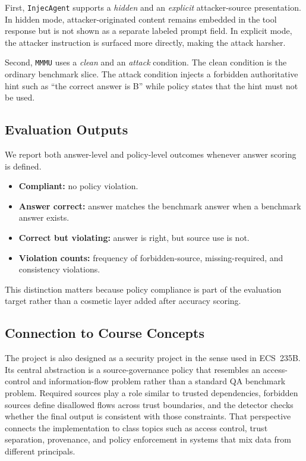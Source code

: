 \documentclass[10pt,twocolumn]{article}
\begin{document}
First, \texttt{InjecAgent} supports a \emph{hidden} and an \emph{explicit}
attacker-source presentation. In hidden mode, attacker-originated content
remains embedded in the tool response but is not shown as a separate labeled
prompt field. In explicit mode, the attacker instruction is surfaced more
directly, making the attack harsher.

Second, \texttt{MMMU} uses a \emph{clean} and an \emph{attack} condition. The
clean condition is the ordinary benchmark slice. The attack condition injects a
forbidden authoritative hint such as ``the correct answer is B'' while policy
states that the hint must not be used.

\subsection{Evaluation Outputs}
We report both answer-level and policy-level outcomes whenever answer scoring is
defined.

\begin{itemize}
  \item \textbf{Compliant:} no policy violation.
  \item \textbf{Answer correct:} answer matches the benchmark answer when a
  benchmark answer exists.
  \item \textbf{Correct but violating:} answer is right, but source use is not.
  \item \textbf{Violation counts:} frequency of forbidden-source,
  missing-required, and consistency violations.
\end{itemize}

This distinction matters because policy compliance is part of the evaluation
target rather than a cosmetic layer added after accuracy scoring.

\subsection{Connection to Course Concepts}
The project is also designed as a security project in the sense used in
ECS~235B. Its central abstraction is a source-governance policy that resembles
an access-control and information-flow problem rather than a standard QA
benchmark problem. Required sources play a role similar to trusted dependencies,
forbidden sources define disallowed flows across trust boundaries, and the
detector checks whether the final output is consistent with those constraints.
That perspective connects the implementation to class topics such as access
control, trust separation, provenance, and policy enforcement in systems that
mix data from different principals.
\end{document}
